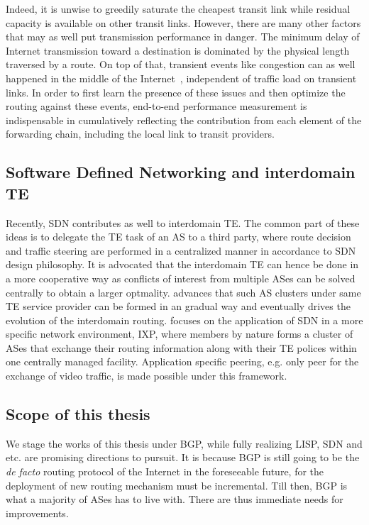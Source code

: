 Indeed, it is unwise to greedily saturate the cheapest transit link while residual capacity is available on other transit links.
However, there are many other factors that may as well put transmission performance in danger.
The minimum delay of Internet transmission toward a destination is dominated by the physical length traversed by a route. 
On top of that, transient events like congestion can as well happened in the middle of the Internet~\cite{Akella2003, Luckie2014}, independent of traffic load on transient links.
In order to first learn the presence of these issues and then optimize the routing against these events, end-to-end performance measurement is indispensable in cumulatively reflecting the contribution from each element of the forwarding chain, including the local link to transit providers.

\subsection{Software Defined Networking and interdomain TE}
Recently, \ac{SDN} contributes as well to interdomain TE. The common part of these ideas is to delegate the TE task of an AS to a third party, where route decision and traffic steering are performed in a centralized manner in accordance to \ac{SDN} design philosophy. It is advocated that the interdomain TE can hence be done in a more cooperative way as conflicts of interest from multiple ASes can be solved centrally to obtain a larger optmality.
\citet{Kotronis2012} advances that such AS clusters under same TE service provider can be formed in an gradual way and eventually drives the evolution of the interdomain routing.
\citet{Gupta2014} focuses on the application of \ac{SDN} in a more specific network environment, \ac{IXP}, where members by nature forms a cluster of ASes that exchange their routing information along with their TE polices within one centrally managed facility. Application specific peering, e.g. only peer for the exchange of video traffic, is made possible under this framework.

\subsection{Scope of this thesis}
We stage the works of this thesis under BGP, while fully realizing \ac{LISP}, \ac{SDN} and etc. are promising directions to pursuit.
It is because BGP is still going to be the \textit{de facto} routing protocol of the Internet in the foreseeable future, for the deployment of new routing mechanism must be incremental.
Till then,  BGP is what a majority of ASes has to live with. 
There are thus immediate needs for improvements.

